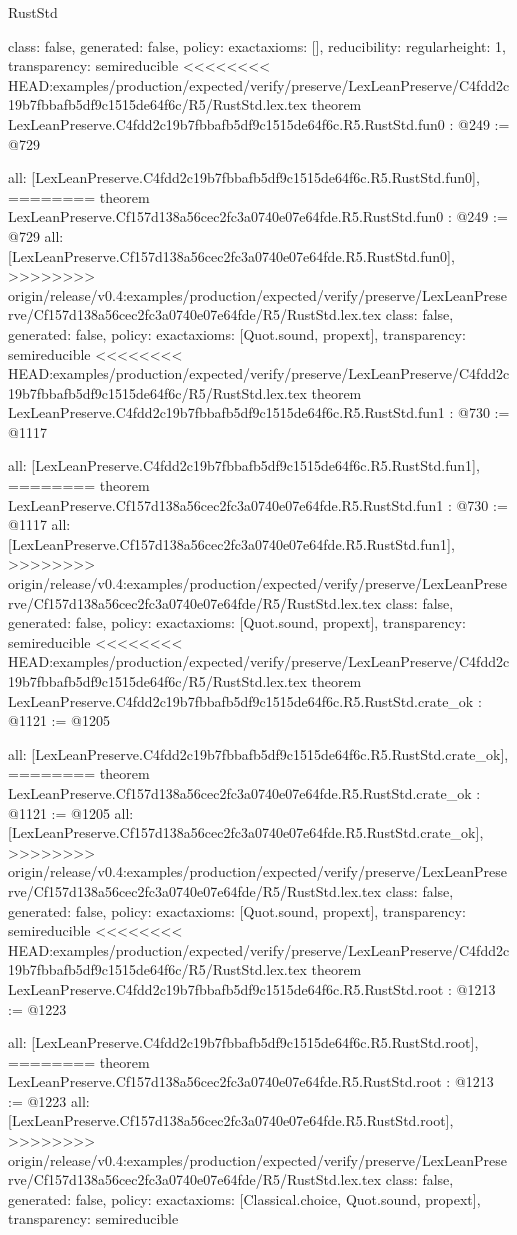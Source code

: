 \begin{lexlean}{RustStd}
\begin{coremodule}
{\begin{coremodule}
{{{  class: false,
  generated: false,
  policy: exact{axioms: []},
  reducibility: regular{height: 1},
  transparency: semireducible
}
<<<<<<<< HEAD:examples/production/expected/verify/preserve/LexLeanPreserve/C4fdd2c19b7fbbafb5df9c1515de64f6c/R5/RustStd.lex.tex
theorem LexLeanPreserve.C4fdd2c19b7fbbafb5df9c1515de64f6c.R5.RustStd.fun0 : @249 := @729 {
  all: [LexLeanPreserve.C4fdd2c19b7fbbafb5df9c1515de64f6c.R5.RustStd.fun0],
========
theorem LexLeanPreserve.Cf157d138a56cec2fc3a0740e07e64fde.R5.RustStd.fun0 : @249 := @729 {
  all: [LexLeanPreserve.Cf157d138a56cec2fc3a0740e07e64fde.R5.RustStd.fun0],
>>>>>>>> origin/release/v0.4:examples/production/expected/verify/preserve/LexLeanPreserve/Cf157d138a56cec2fc3a0740e07e64fde/R5/RustStd.lex.tex
  class: false,
  generated: false,
  policy: exact{axioms: [Quot.sound, propext]},
  transparency: semireducible
}
<<<<<<<< HEAD:examples/production/expected/verify/preserve/LexLeanPreserve/C4fdd2c19b7fbbafb5df9c1515de64f6c/R5/RustStd.lex.tex
theorem LexLeanPreserve.C4fdd2c19b7fbbafb5df9c1515de64f6c.R5.RustStd.fun1 : @730 := @1117 {
  all: [LexLeanPreserve.C4fdd2c19b7fbbafb5df9c1515de64f6c.R5.RustStd.fun1],
========
theorem LexLeanPreserve.Cf157d138a56cec2fc3a0740e07e64fde.R5.RustStd.fun1 : @730 := @1117 {
  all: [LexLeanPreserve.Cf157d138a56cec2fc3a0740e07e64fde.R5.RustStd.fun1],
>>>>>>>> origin/release/v0.4:examples/production/expected/verify/preserve/LexLeanPreserve/Cf157d138a56cec2fc3a0740e07e64fde/R5/RustStd.lex.tex
  class: false,
  generated: false,
  policy: exact{axioms: [Quot.sound, propext]},
  transparency: semireducible
}
<<<<<<<< HEAD:examples/production/expected/verify/preserve/LexLeanPreserve/C4fdd2c19b7fbbafb5df9c1515de64f6c/R5/RustStd.lex.tex
theorem LexLeanPreserve.C4fdd2c19b7fbbafb5df9c1515de64f6c.R5.RustStd.crate_ok : @1121 := @1205 {
  all: [LexLeanPreserve.C4fdd2c19b7fbbafb5df9c1515de64f6c.R5.RustStd.crate_ok],
========
theorem LexLeanPreserve.Cf157d138a56cec2fc3a0740e07e64fde.R5.RustStd.crate_ok : @1121 := @1205 {
  all: [LexLeanPreserve.Cf157d138a56cec2fc3a0740e07e64fde.R5.RustStd.crate_ok],
>>>>>>>> origin/release/v0.4:examples/production/expected/verify/preserve/LexLeanPreserve/Cf157d138a56cec2fc3a0740e07e64fde/R5/RustStd.lex.tex
  class: false,
  generated: false,
  policy: exact{axioms: [Quot.sound, propext]},
  transparency: semireducible
}
<<<<<<<< HEAD:examples/production/expected/verify/preserve/LexLeanPreserve/C4fdd2c19b7fbbafb5df9c1515de64f6c/R5/RustStd.lex.tex
theorem LexLeanPreserve.C4fdd2c19b7fbbafb5df9c1515de64f6c.R5.RustStd.root : @1213 := @1223 {
  all: [LexLeanPreserve.C4fdd2c19b7fbbafb5df9c1515de64f6c.R5.RustStd.root],
========
theorem LexLeanPreserve.Cf157d138a56cec2fc3a0740e07e64fde.R5.RustStd.root : @1213 := @1223 {
  all: [LexLeanPreserve.Cf157d138a56cec2fc3a0740e07e64fde.R5.RustStd.root],
>>>>>>>> origin/release/v0.4:examples/production/expected/verify/preserve/LexLeanPreserve/Cf157d138a56cec2fc3a0740e07e64fde/R5/RustStd.lex.tex
  class: false,
  generated: false,
  policy: exact{axioms: [Classical.choice, Quot.sound, propext]},
  transparency: semireducible
}

}}}}}}
\end{coremodule}}
\end{coremodule}
\end{lexlean}

